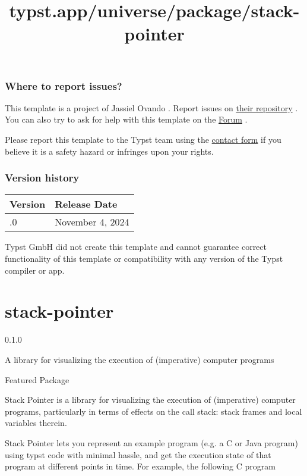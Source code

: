 \subsubsection{Where to report issues?}\label{where-to-report-issues}

This template is a project of Jassiel Ovando . Report issues on
\href{https://github.com/jassielof/typst-templates}{their repository} .
You can also try to ask for help with this template on the
\href{https://forum.typst.app}{Forum} .

Please report this template to the Typst team using the
\href{https://typst.app/contact}{contact form} if you believe it is a
safety hazard or infringes upon your rights.

\label{versions}
\subsubsection{Version history}\label{version-history}

\begin{longtable}[]{@{}ll@{}}
\toprule\noalign{}
Version & Release Date \\
\midrule\noalign{}
\endhead
\bottomrule\noalign{}
\endlastfoot
7.0.0 & November 4, 2024 \\
\end{longtable}

Typst GmbH did not create this template and cannot guarantee correct
functionality of this template or compatibility with any version of the
Typst compiler or app.


\title{typst.app/universe/package/stack-pointer}

\label{banner}
\section{stack-pointer}\label{stack-pointer}

{ 0.1.0 }

A library for visualizing the execution of (imperative) computer
programs

{ } Featured Package

\label{readme}
Stack Pointer is a library for visualizing the execution of (imperative)
computer programs, particularly in terms of effects on the call stack:
stack frames and local variables therein.

Stack Pointer lets you represent an example program (e.g. a C or Java
program) using typst code with minimal hassle, and get the execution
state of that program at different points in time. For example, the
following C program

